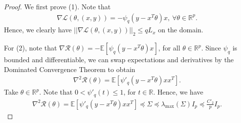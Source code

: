 \documentclass{article}
\newcommand{\indep}{\rotatebox[origin=c]{90}{$\models$}}
\begin{document}
\begin{proof}
We first prove (1).
Note that
\begin{align*}
\nabla \mathcal{L}(\theta, (x, y)) = -\psi_q(y - x^T\theta)x, \ \forall \theta \in \mathbb{R}^p. 
\end{align*}
Hence, we clearly have $||\nabla \mathcal{L}(\theta, (x, y))||_2 \leq q L_x$ on the domain.

For (2), note that $\nabla\mathcal{R}(\theta) = -\mathbb{E}[\psi_q(y - x^T\theta)x]$, for all $\theta \in \mathbb{R}^p$. Since $\psi_q$ is bounded and differentiable, we can swap expectations and derivatives by the Dominated Convergence Theorem to obtain 
\begin{align*}
\nabla^2\mathcal{R}(\theta) = \mathbb{E}[\psi'_q(y - x^T\theta)xx^T].
\end{align*}
Take $\theta \in \mathbb{R}^p$. Note that $0 < \psi'_q(t) \leq 1$, for $t \in \mathbb{R}$. Hence, we have
\begin{align*}
\nabla^2\mathcal{R}(\theta) = \mathbb{E}[\psi'_q(y - x^T\theta)xx^T] \preceq \Sigma \preceq \lambda_{\max}(\Sigma)I_p \preceq \frac{C'_2}{p}I_p.
\end{align*}


\end{proof}
\end{document}
